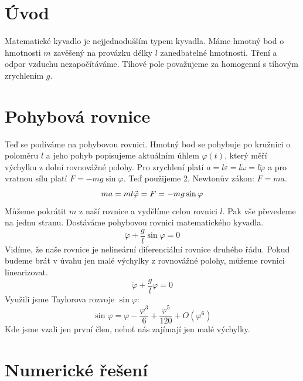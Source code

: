\section{Úvod}
\label{sec:Úvod}

Matematické kyvadlo je nejjednodušším typem kyvadla. Máme hmotný bod o hmotnosti $m$ zavěšený na provázku délky $l$ zanedbatelné hmotnosti. Tření a odpor vzduchu nezapočítáváme. Tíhové pole považujeme za homogenní s tíhovým zrychlením $g$.

\section{Pohybová rovnice}
\label{sec:Pohybová rovnice}
Teď se podíváme na pohybovou rovnici. Hmotný bod se pohybuje po kružnici o poloměru $l$ a jeho pohyb popisujeme aktuálním úhlem $\varphi(t)$, který měří výchylku z dolní rovnovážné polohy. Pro zrychlení platí $a=l\varepsilon=l\dot{\omega}=l\ddot{\varphi}$ a pro vratnou sílu platí $F=-mg\sin\varphi$. Teď použijeme 2. Newtonův zákon: $F=ma$.
\begin{equation*}
ma=ml\ddot{\varphi}=F=-mg\sin\varphi\\
\end{equation*}
Můžeme pokrátit $m$ z naší rovnice a vydělíme celou rovnici $l$. Pak vše převedeme na jednu stranu. Dostáváme pohybovou rovnici matematického kyvadla.
\begin{equation}
\label{pohyb}
\boxed{\ddot{\varphi}+\frac{g}{l}\sin\varphi=0}
\end{equation}
Vidíme, že naše rovnice je nelineární diferenciální rovnice druhého řádu. Pokud budeme brát v úvahu jen malé výchylky z rovnovážné polohy, můžeme rovnici linearizovat.
\begin{equation}
\ddot{\varphi}+\frac{g}{l}\varphi=0
\end{equation}
Využili jsme Taylorova rozvoje $\sin\varphi$:
\begin{equation*}
\sin\varphi = \varphi-\frac{\varphi^3}{6}+\frac{\varphi^5}{120}+O\left(\varphi^6\right)
\end{equation*}
Kde jsme vzali jen první člen, neboť nás zajímají jen malé výchylky.

\section{Numerické řešení}
\label{sec:Numerické řešení}

